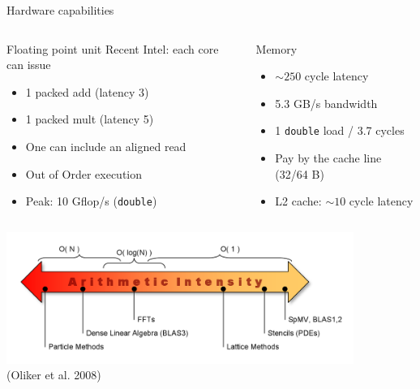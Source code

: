 \begin{frame}{Hardware capabilities}
  \begin{columns}
    \begin{column}{0.5\textwidth}
      \begin{block}{Floating point unit}
        Recent Intel: each core can issue
        \begin{itemize}
        \item 1 packed add (latency 3)
        \item 1 packed mult (latency 5)
        \item One can include an aligned read
        \item Out of Order execution
        \item Peak: 10 Gflop/s (\texttt{double})
        \end{itemize}
      \end{block}
    \end{column}
    \begin{column}{0.5\textwidth}
      \begin{block}{Memory}
        \begin{itemize}
        \item $\sim 250$ cycle latency
        \item 5.3 GB/s bandwidth
        \item 1 \texttt{double} load / 3.7 cycles
        \item Pay by the cache line (32/64 B)
        \item L2 cache: $\sim 10$ cycle latency
        \end{itemize}
      \end{block}
    \end{column}
  \end{columns}
  \begin{block}{}%
    \centering
    \includegraphics[width=0.85\textwidth]{figures/OlikerArithmeticIntensity} \\
    \vspace{-1em}
    {\tiny (Oliker et al. 2008)}
  \end{block}
\end{frame}
